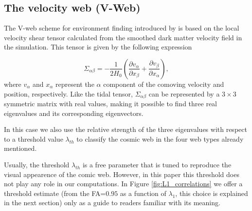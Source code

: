 \documentclass[a4,useAMS,usenatbib,usegraphicx]{mn2e}
\newcommand{\pr}[1]{ \left( #1 \right) }
\newcommand{\eq}[2]{\begin{equation} \label{eq:#1} #2 \end{equation}}
\begin{document}
\subsection{The velocity web (V-Web)}
\label{subsec:Vweb}

The V-web scheme for environment finding introduced by
\cite{Hoffman12} is based on the local velocity shear tensor
calculated from the smoothed dark matter  velocity field in the
simulation. 
This tensor is given by the  following expression

\eq{V_web}
{	\Sigma_{\alpha\beta} = -\frac{1}{2H_0}\pr{\frac{\partial v_{\alpha}}
{\partial x_{\beta}}+\frac{\partial v_{\beta}}{\partial x_{\alpha}}},}
where $v_{\alpha}$ and $x_{\alpha}$ represent the $\alpha$ component of 
the comoving velocity and position, respectively. Like the tidal tensor, 
$\Sigma_{\alpha\beta}$ can be represented by a $3\times 3$ symmetric 
matrix with real values, making it possible to find three real
eigenvalues and its corresponding eigenvectors.


In this case we also use the relative strength of the three eigenvalues with 
respect to a threshold value $\lambda_{th}$ to classify the cosmic web
in the four web types already mentioned.


Usually, the threshold $\lambda_{th}$ is a free parameter that is
tuned to reproduce the visual appearence of the comic web. 
However, in this paper this threshold does not play any role in our
computations.
In Figure \ref{fig:L1_correlations} we offer a threshold estimate
(from the FA=$0.95$ as a function of $\lambda_1$, this choice is
explained in the next section) only as a guide to readers familiar
with its meaning.  
\end{document}
